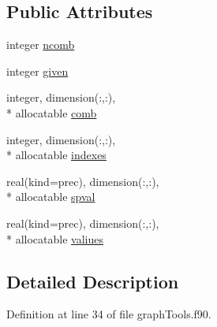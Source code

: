 \subsection*{Public Attributes}
\begin{DoxyCompactItemize}
\item 
integer \hyperlink{classgraphtools_a2b525a855ff204b1f0888367afad341b}{ncomb}
\item 
integer \hyperlink{classgraphtools_ad9b2084d88501c791d7004540a375e1b}{given}
\item 
integer, dimension(\-:,\-:), \\*
allocatable \hyperlink{classgraphtools_a58276cd3a6f06eca01afff94e40135a3}{comb}
\item 
integer, dimension(\-:,\-:), \\*
allocatable \hyperlink{classgraphtools_a06bc686e600e3a5ff5ca5cc86ac94872}{indexes}
\item 
real(kind=prec), dimension(\-:,\-:), \\*
allocatable \hyperlink{classgraphtools_aa469ea301df7677b90448dfa88f26153}{spval}
\item 
real(kind=prec), dimension(\-:,\-:), \\*
allocatable \hyperlink{classgraphtools_a637c15ec541e2e87680f381c2a542e27}{valiues}
\end{DoxyCompactItemize}


\subsection{Detailed Description}


Definition at line 34 of file graph\-Tools.\-f90.



